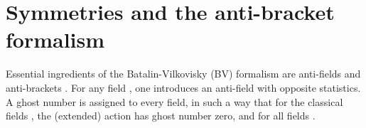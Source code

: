 \documentclass[a4paper,12pt]{article}
\begin{document}

\section{Symmetries and the anti-bracket formalism}
\label{sec:BV}

Essential ingredients of the Batalin-Vilkovisky (BV) formalism are
anti-fields and anti-brackets \cite{BV,cano,gomis}.  For any field
\coordHE{}, one introduces an anti-field \coordHE{} with opposite
statistics.  A ghost number is assigned to every field, in such a way
that for the classical fields \coordHE{}, the (extended) action has
ghost number zero,
and for all fields \coordHE{}. \\
\end{document}
